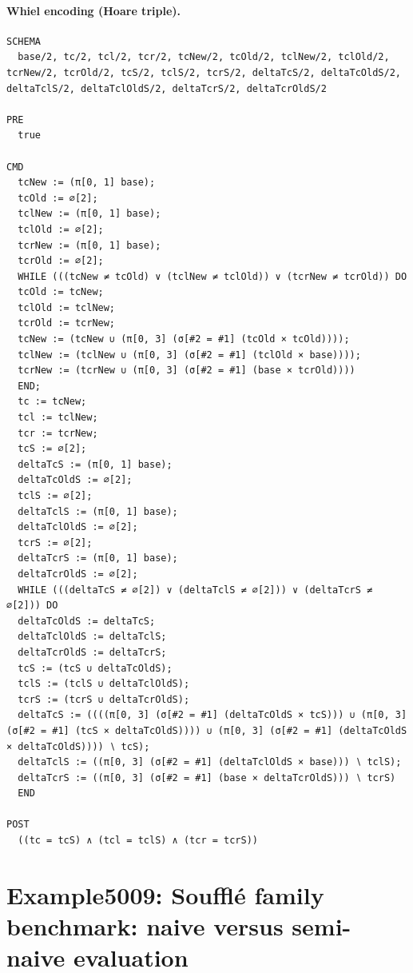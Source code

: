 \documentclass[10pt]{article}
\begin{document}
\paragraph{Whiel encoding (Hoare triple).}

\begin{Verbatim}[fontsize=\tiny,breaklines=true,breakanywhere=true,frame=single,framesep=1.5mm]
SCHEMA
  base/2, tc/2, tcl/2, tcr/2, tcNew/2, tcOld/2, tclNew/2, tclOld/2, tcrNew/2, tcrOld/2, tcS/2, tclS/2, tcrS/2, deltaTcS/2, deltaTcOldS/2, deltaTclS/2, deltaTclOldS/2, deltaTcrS/2, deltaTcrOldS/2

PRE
  true 

CMD
  tcNew := (π[0, 1] base);
  tcOld := ∅[2];
  tclNew := (π[0, 1] base);
  tclOld := ∅[2];
  tcrNew := (π[0, 1] base);
  tcrOld := ∅[2];
  WHILE (((tcNew ≠ tcOld) ∨ (tclNew ≠ tclOld)) ∨ (tcrNew ≠ tcrOld)) DO
  tcOld := tcNew;
  tclOld := tclNew;
  tcrOld := tcrNew;
  tcNew := (tcNew ∪ (π[0, 3] (σ[#2 = #1] (tcOld × tcOld))));
  tclNew := (tclNew ∪ (π[0, 3] (σ[#2 = #1] (tclOld × base))));
  tcrNew := (tcrNew ∪ (π[0, 3] (σ[#2 = #1] (base × tcrOld))))
  END;
  tc := tcNew;
  tcl := tclNew;
  tcr := tcrNew;
  tcS := ∅[2];
  deltaTcS := (π[0, 1] base);
  deltaTcOldS := ∅[2];
  tclS := ∅[2];
  deltaTclS := (π[0, 1] base);
  deltaTclOldS := ∅[2];
  tcrS := ∅[2];
  deltaTcrS := (π[0, 1] base);
  deltaTcrOldS := ∅[2];
  WHILE (((deltaTcS ≠ ∅[2]) ∨ (deltaTclS ≠ ∅[2])) ∨ (deltaTcrS ≠ ∅[2])) DO
  deltaTcOldS := deltaTcS;
  deltaTclOldS := deltaTclS;
  deltaTcrOldS := deltaTcrS;
  tcS := (tcS ∪ deltaTcOldS);
  tclS := (tclS ∪ deltaTclOldS);
  tcrS := (tcrS ∪ deltaTcrOldS);
  deltaTcS := ((((π[0, 3] (σ[#2 = #1] (deltaTcOldS × tcS))) ∪ (π[0, 3] (σ[#2 = #1] (tcS × deltaTcOldS)))) ∪ (π[0, 3] (σ[#2 = #1] (deltaTcOldS × deltaTcOldS)))) ∖ tcS);
  deltaTclS := ((π[0, 3] (σ[#2 = #1] (deltaTclOldS × base))) ∖ tclS);
  deltaTcrS := ((π[0, 3] (σ[#2 = #1] (base × deltaTcrOldS))) ∖ tcrS)
  END

POST
  ((tc = tcS) ∧ (tcl = tclS) ∧ (tcr = tcrS))
\end{Verbatim}

\Needspace{0.45\textheight}

\section{Example5009: Soufflé family benchmark: naive versus semi-naive evaluation}\label{case:Example5009}
\end{document}
